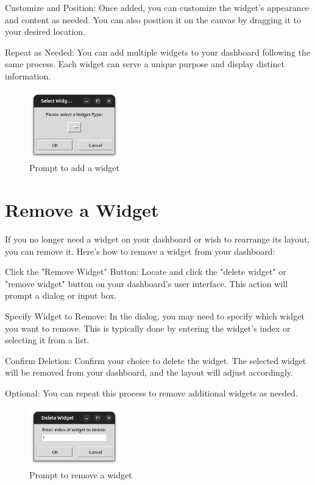 Customize and Position: Once added, you can customize the widget's appearance and content as needed. You can also position it on the canvas by dragging it to your desired location.

Repeat as Needed: You can add multiple widgets to your dashboard following the same process. Each widget can serve a unique purpose and display distinct information.

\begin{figure}[!hbt]
	\centering
	\includegraphics[width=0.35\textwidth]{pictures/add_widget.png}
	\caption{Prompt to add a widget}
	\label{fig:add_widget}
\end{figure}

\section{Remove a Widget}
If you no longer need a widget on your dashboard or wish to rearrange its layout, you can remove it. Here's how to remove a widget from your dashboard:

Click the "Remove Widget" Button: Locate and click the "delete widget" or "remove widget" button on your dashboard's user interface. This action will prompt a dialog or input box.

Specify Widget to Remove: In the dialog, you may need to specify which widget you want to remove. This is typically done by entering the widget's index or selecting it from a list.

Confirm Deletion: Confirm your choice to delete the widget. The selected widget will be removed from your dashboard, and the layout will adjust accordingly.

Optional: You can repeat this process to remove additional widgets as needed.

\begin{figure}[!hbt]
	\centering
	\includegraphics[width=0.35\textwidth]{pictures/delete_widget.png}
	\caption{Prompt to remove a widget}
	\label{fig:delete_widget}
\end{figure}


